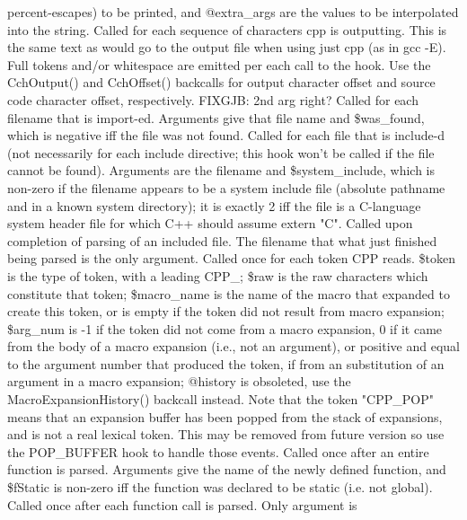 percent-escapes) to be printed, and @extra\_\-args are the values to be 
interpolated into the string.
Called for each sequence of characters cpp is outputting.  This is the
same text as would go to the output file when using just cpp (as in gcc -E).
Full tokens and/or whitespace are emitted per each call to the hook.
Use the CchOutput() and CchOffset() backcalls for output character offset
and source code character offset, respectively.
 FIXGJB: 2nd arg right?
Called for each filename that is \pphash{}import-ed.  Arguments give that
file name and \$was\_\-found, which is negative iff the file was not found.
Called for each file that is \pphash{}include-d (not necessarily for each \pphash{}include
directive; this hook won't be called if the file cannot be found).
Arguments are the filename and \$system\_\-include, which is non-zero if the filename
appears to be a system include file (absolute pathname and in a known
system directory);  it is exactly 2 iff the file is a C-language
system header file for which C++ should assume extern "C".
Called upon completion of parsing of an included file.  The filename
that what just finished being parsed is the only argument.
Called once for each token CPP reads.  \$token is the type of token,
with a leading CPP\_\-; \$raw is the raw characters which constitute that
token; \$macro\_\-name is the name of the macro that expanded to create this token,
or is empty if the token did not result from macro expansion; \$arg\_\-num is -1
if the token did not come from a macro expansion, 0 if it came from the
body of a macro expansion (i.e., not an argument), or positive and equal
to the argument number that produced the token, if from an substitution
of an argument in a macro expansion; @history is obsoleted, use the
MacroExpansionHistory() backcall instead.  Note that the token "CPP\_\-POP"
means that an expansion buffer has been popped from the stack of expansions,
and is not a real lexical token.  This may be removed from future version
so use the POP\_\-BUFFER hook to handle those events.
Called once after an entire function is parsed.  Arguments
give the name of the newly defined function, and \$fStatic is non-zero
iff the function was declared to be static (i.e. not global).
Called once after each function call is parsed.  Only argument is
